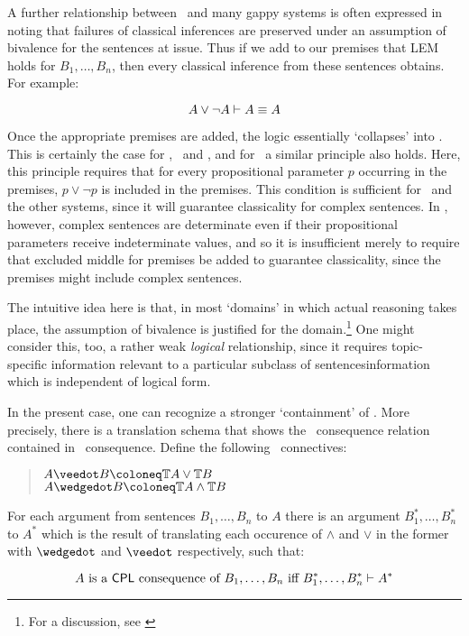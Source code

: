 A further relationship between \CPL\ and many gappy systems is often expressed in noting that failures of classical inferences are preserved under an assumption of bivalence for the sentences at issue. Thus if we add to our premises that LEM holds for $B_1,\dots,B_n$, then every classical inference from these sentences obtains. For example:

\[ {A\vee\neg A}\vdash{A \equiv A} \]

\noindent Once the appropriate premises are added, the logic essentially `collapses' into \CPL. This is certainly the case for \Kthree, \Lthree\ and \Bthree, and for \GO\ a similar principle also holds. Here, this principle requires that for every propositional parameter $p$ occurring in the premises, $p \vee \neg p$ is included in the premises. This condition is sufficient for \Kthree\ and the other systems, since it will guarantee classicality for complex sentences. In \GO, however, complex sentences are determinate even if their propositional parameters receive indeterminate values, and so it is insufficient merely to require that excluded middle for premises be added to guarantee classicality, since the premises might include complex sentences.

The intuitive idea here is that, in most `domains' in which actual reasoning takes place, the assumption of bivalence is justified for the domain.\footnote{For a discussion, see \cite{Beall2006}} One might consider this, too, a rather weak \emph{logical} relationship, since it requires topic-specific information relevant to a particular subclass of sentences\textemdash information which is independent of logical form.

In the present case, one can recognize a stronger `containment' of \CPL. More precisely, there is a translation schema that shows the \CPL\ consequence relation contained in \GO\ consequence. Define the following \GO\ connectives:

\begin{quote}
 $ A \ExtDisj B \Defined \Ttrue A \vee \Ttrue B $\\
 $ A \ExtConj B \Defined \Ttrue A \wedge \Ttrue B$
\end{quote}

\noindent For each argument from sentences $B_1,\dots,B_n$ to $A$ there is an argument $B_1^*,\dots,B_n^*$ to $A^*$ which is the result of translating each occurence of $\wedge$ and $\vee$ in the former with $\ExtConj$ and $\ExtDisj$ respectively, such that:

\[ A \mbox{ is a \ensuremath{\mathsf{CPL}}\ consequence of } B_1,\dots,B_n \mbox{ iff } {B_1^*,\dots,B_n^*}\vdash{A^*} \]

